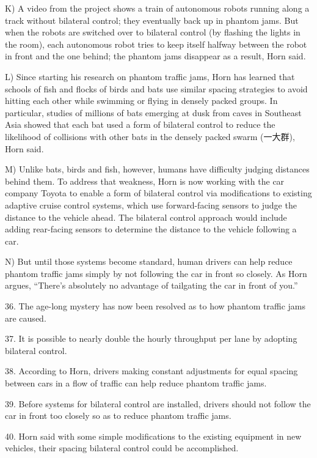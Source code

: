 \documentclass[UTF8,11pt]{ctexart}
\begin{document}
K) A video from the project shows a train of autonomous robots running along a track without bilateral control; they eventually back up in phantom jams. But when the robots are switched over to bilateral control (by flashing the lights in the room), each autonomous robot tries to keep itself halfway between the robot in front and the one behind; the phantom jams disappear as a result, Horn said.


L) Since starting his research on phantom traffic jams, Horn has learned that schools of fish and flocks of birds and bats use similar spacing strategies to avoid hitting each other while swimming or flying in densely packed groups. In particular, studies of millions of bats emerging at dusk from caves in Southeast Asia showed that each bat used a form of bilateral control to reduce the likelihood of collisions with other bats in the densely packed swarm (一大群), Horn said.


M) Unlike bats, birds and fish, however, humans have difficulty judging distances behind them. To address that weakness, Horn is now working with the car company Toyota to enable a form of bilateral control via modifications to existing adaptive cruise control systems, which use forward-facing sensors to judge the distance to the vehicle ahead. The bilateral control approach would include adding rear-facing sensors to determine the distance to the vehicle following a car.


N) But until those systems become standard, human drivers can help reduce phantom traffic jams simply by not following the car in front so closely. As Horn argues, “There’s absolutely no advantage of tailgating the car in front of you.”


36. The age-long mystery has now been resolved as to how phantom traffic jams are caused.


37. It is possible to nearly double the hourly throughput per lane by adopting bilateral control.


38. According to Horn, drivers making constant adjustments for equal spacing between cars in a flow of traffic can help reduce phantom traffic jams.


39. Before systems for bilateral control are installed, drivers should not follow the car in front too closely so as to reduce phantom traffic jams.


40. Horn said with some simple modifications to the existing equipment in new vehicles, their spacing bilateral control could be accomplished.
\end{document}
